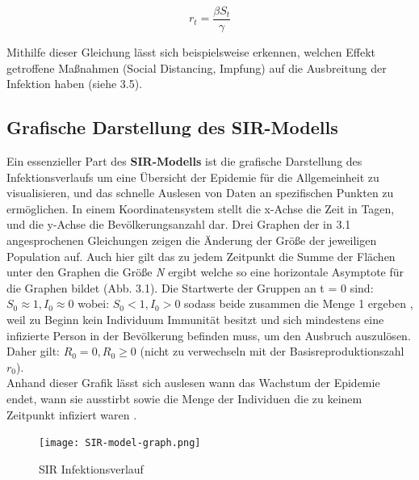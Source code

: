 \documentclass[12pt]{scrartcl} %
\begin{document}
$$ r_{t} = \frac{\beta S_{t}}{\gamma} $$

Mithilfe dieser Gleichung lässt sich beispielsweise erkennen, welchen Effekt getroffene Maßnahmen (Social Distancing, Impfung) auf die Ausbreitung der Infektion haben (siehe 3.5).


\subsection{Grafische Darstellung des SIR-Modells}

Ein essenzieller Part des \textbf{SIR-Modells} ist die grafische Darstellung des Infektionsverlaufs um eine Übersicht der Epidemie für die Allgemeinheit zu visualisieren, und das schnelle Auslesen von Daten an spezifischen Punkten zu ermöglichen.
In einem Koordinatensystem stellt die x-Achse die Zeit in Tagen, und die y-Achse die Bevölkerungsanzahl dar. Drei Graphen der in 3.1 angesprochenen Gleichungen zeigen die Änderung der Größe der jeweiligen Population auf.
Auch hier gilt das zu jedem Zeitpunkt die Summe der Flächen unter den Graphen die Größe \textit{N} ergibt welche so eine horizontale Asymptote für die Graphen bildet (Abb. 3.1).
Die Startwerte der Gruppen an t = 0 sind: 
$S_{0} \approx 1, I_{0} \approx 0$ wobei: $ S_{0} < 1, I_{0} > 0$ sodass beide zusammen die Menge 1 ergeben \cite{4},
weil zu Beginn kein Individuum Immunität besitzt und sich mindestens eine infizierte Person in der Bevölkerung befinden muss, um den Ausbruch auszulösen. Daher gilt: $R_{0} = 0, R_{0} \geq 0$ (nicht zu verwechseln mit der Basisreproduktionszahl $r_{0}$).\\
Anhand dieser Grafik lässt sich auslesen wann das Wachstum der Epidemie endet, wann sie ausstirbt sowie die Menge der Individuen die zu keinem Zeitpunkt infiziert waren \cite{1}.

	\begin{figure}[h]
	\centering
	\texttt{[image: SIR-model-graph.png]}
	\caption[SIR Infektionsverlauf,\newline https://www.davidketcheson.info/2020/03/17/SIR\textunderscore model.html]{SIR Infektionsverlauf}
	\end{figure}


\end{document}
